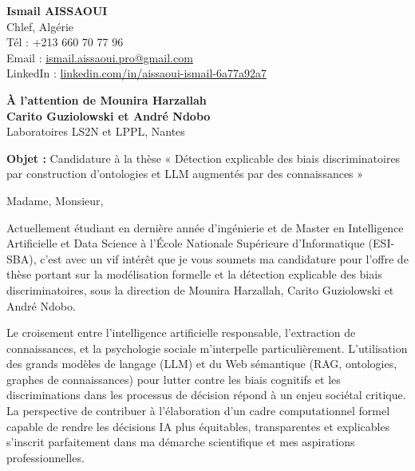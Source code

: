 \documentclass[11pt,a4paper]{letter}
\begin{document}
\begin{flushleft}
\textbf{Ismail AISSAOUI}\\
Chlef, Algérie\\
Tél : +213 660 70 77 96\\
Email : \href{mailto:ismail.aissaoui.pro@gmail.com}{ismail.aissaoui.pro@gmail.com}\\
LinkedIn : \href{https://linkedin.com/in/aissaoui-ismail-6a77a92a7}{linkedin.com/in/aissaoui-ismail-6a77a92a7}
\end{flushleft}

\vspace{1cm}

\begin{flushright}
\textbf{À l'attention de Mounira Harzallah}\\
\textbf{Carito Guziolowski et André Ndobo}\\
Laboratoires LS2N et LPPL, Nantes\\
\end{flushright}

\vspace{1cm}

\textbf{Objet :} Candidature à la thèse « Détection explicable des biais discriminatoires par construction d'ontologies et LLM augmentés par des connaissances »

\vspace{0.5cm}

Madame, Monsieur,

Actuellement étudiant en dernière année d'ingénierie et de Master en Intelligence Artificielle et Data Science à l'École Nationale Supérieure d'Informatique (ESI-SBA), c'est avec un vif intérêt que je vous soumets ma candidature pour l'offre de thèse portant sur la modélisation formelle et la détection explicable des biais discriminatoires, sous la direction de Mounira Harzallah, Carito Guziolowski et André Ndobo.

Le croisement entre l'intelligence artificielle responsable, l'extraction de connaissances, et la psychologie sociale m'interpelle particulièrement. L'utilisation des grands modèles de langage (LLM) et du Web sémantique (RAG, ontologies, graphes de connaissances) pour lutter contre les biais cognitifs et les discriminations dans les processus de décision répond à un enjeu sociétal critique. La perspective de contribuer à l'élaboration d'un cadre computationnel formel capable de rendre les décisions IA plus équitables, transparentes et explicables s'inscrit parfaitement dans ma démarche scientifique et mes aspirations professionnelles.
\end{document}
